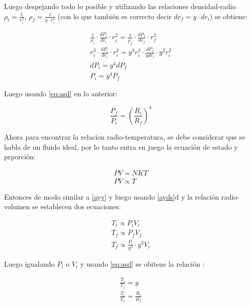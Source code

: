 \documentclass[2pt]{article}
\begin{document}
Luego despejando todo lo posible y utilizando las relaciones densidad-radio $\rho_i = \frac{1}{r^3_i}$, $\rho_f = \frac{1}{y\cdot r^3_i}$ (con lo que también es correcto decir $dr_f=y\cdot dr_i$) se obtiene:

 \begin{subequations}\label{ayds}
\begin{align}
        \frac{1}{\rho_i} \cdot \frac{dP_i}{dr_i} \cdot r^2_i= \frac{1}{\rho_f} \cdot \frac{dP_f}{dr_f} \cdot r^2_f \\        
        r^3_i \cdot \frac{dP_i}{dr_i} \cdot r^2_i = y^3 r^3_i \cdot \frac{dP_f}{y dr_i} \cdot y^2 r^2_i   \\ 
        dP_i=y^4 dP_f  \\
        P_i=y^4 P_f     
\end{align}
\end{subequations}

Luego usando \ref{eq:asd} en lo anterior:

\begin{equation}
\frac{P_f}{P_i}=(\frac{R_i}{R_f})^4
\end{equation}




Ahora para encontrar la relacion radio-temperatura, se debe considerar que se habla de un fluido ideal, por lo tanto entra en juego la ecuación de estado y prporción:

\begin{subequations}
\begin{align}
        PV=NKT \\
        PV \propto T
\end{align}
\end{subequations}

Entonces de modo similar a \ref{ayy} y luego usando \ref{ayds}d y la relación radio-volumen se establecen dos ecuaciones:

    
\begin{subequations}
\begin{align}
        T_i \propto P_i V_i \\
        T_f \propto P_f V_f \\
        T_f \propto \frac{P_i}{y^4}\cdot y^3 V_i
\end{align}
\end{subequations}

Luego igualando $P_i$ o $V_i$ y usando \ref{eq:asd} se obitene la relación :

\begin{subequations}
\begin{align}
        \frac{T_i}{T_f}=y \\
        \frac{T_i}{T_f}=\frac{R_i}{R_f}
\end{align}
\end{subequations}
\end{document}
